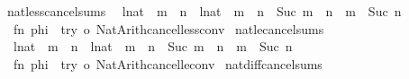\begin{isabellebody}
\isanewline
{}\isamarkupfalse%
\ natless{\isacharunderscore}{\kern0pt}cancel{\isacharunderscore}{\kern0pt}sums\isanewline
\ \ {\isacharparenleft}{\kern0pt}{\isachardoublequoteopen}{\isacharparenleft}{\kern0pt}l{\isacharcolon}{\kern0pt}{\isacharcolon}{\kern0pt}nat{\isacharparenright}{\kern0pt}\ {\isacharplus}{\kern0pt}\ m\ {\isacharless}{\kern0pt}\ n{\isachardoublequoteclose}\ {\isacharbar}{\kern0pt}\ {\isachardoublequoteopen}{\isacharparenleft}{\kern0pt}l{\isacharcolon}{\kern0pt}{\isacharcolon}{\kern0pt}nat{\isacharparenright}{\kern0pt}\ {\isacharless}{\kern0pt}\ m\ {\isacharplus}{\kern0pt}\ n{\isachardoublequoteclose}\ {\isacharbar}{\kern0pt}\ {\isachardoublequoteopen}Suc\ m\ {\isacharless}{\kern0pt}\ n{\isachardoublequoteclose}\ {\isacharbar}{\kern0pt}\ {\isachardoublequoteopen}m\ {\isacharless}{\kern0pt}\ Suc\ n{\isachardoublequoteclose}{\isacharparenright}{\kern0pt}\ {\isacharequal}{\kern0pt}\isanewline
\ \ {\isacartoucheopen}fn\ phi\ {\isacharequal}{\kern0pt}{\isachargreater}{\kern0pt}\ try\ o\ Nat{\isacharunderscore}{\kern0pt}Arith{\isachardot}{\kern0pt}cancel{\isacharunderscore}{\kern0pt}less{\isacharunderscore}{\kern0pt}conv{\isacartoucheclose}\isanewline
\isanewline
{}\isamarkupfalse%
\ natle{\isacharunderscore}{\kern0pt}cancel{\isacharunderscore}{\kern0pt}sums\isanewline
\ \ {\isacharparenleft}{\kern0pt}{\isachardoublequoteopen}{\isacharparenleft}{\kern0pt}l{\isacharcolon}{\kern0pt}{\isacharcolon}{\kern0pt}nat{\isacharparenright}{\kern0pt}\ {\isacharplus}{\kern0pt}\ m\ {\isasymle}\ n{\isachardoublequoteclose}\ {\isacharbar}{\kern0pt}\ {\isachardoublequoteopen}{\isacharparenleft}{\kern0pt}l{\isacharcolon}{\kern0pt}{\isacharcolon}{\kern0pt}nat{\isacharparenright}{\kern0pt}\ {\isasymle}\ m\ {\isacharplus}{\kern0pt}\ n{\isachardoublequoteclose}\ {\isacharbar}{\kern0pt}\ {\isachardoublequoteopen}Suc\ m\ {\isasymle}\ n{\isachardoublequoteclose}\ {\isacharbar}{\kern0pt}\ {\isachardoublequoteopen}m\ {\isasymle}\ Suc\ n{\isachardoublequoteclose}{\isacharparenright}{\kern0pt}\ {\isacharequal}{\kern0pt}\isanewline
\ \ {\isacartoucheopen}fn\ phi\ {\isacharequal}{\kern0pt}{\isachargreater}{\kern0pt}\ try\ o\ Nat{\isacharunderscore}{\kern0pt}Arith{\isachardot}{\kern0pt}cancel{\isacharunderscore}{\kern0pt}le{\isacharunderscore}{\kern0pt}conv{\isacartoucheclose}\isanewline
\isanewline
{}\isamarkupfalse%
\ natdiff{\isacharunderscore}{\kern0pt}cancel{\isacharunderscore}{\kern0pt}sums\isanewline

\end{isabellebody}
